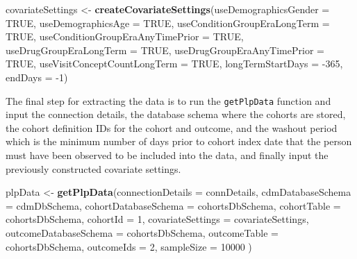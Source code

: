 \documentclass[11pt]{book}
\newenvironment{Shaded}{\begin{snugshade}}{\end{snugshade}}
\newcommand{\DataTypeTok}[1]{\textcolor[rgb]{0.13,0.29,0.53}{#1}}
\newcommand{\DecValTok}[1]{\textcolor[rgb]{0.00,0.00,0.81}{#1}}
\newcommand{\KeywordTok}[1]{\textcolor[rgb]{0.13,0.29,0.53}{\textbf{#1}}}
\newcommand{\NormalTok}[1]{#1}
\newcommand{\OtherTok}[1]{\textcolor[rgb]{0.56,0.35,0.01}{#1}}
\newcommand{\StringTok}[1]{\textcolor[rgb]{0.31,0.60,0.02}{#1}}
\theoremstyle{definition}
\theoremstyle{definition}
\theoremstyle{definition}
\theoremstyle{remark}
\begin{document}
\begin{Shaded}
\begin{Highlighting}[]
\NormalTok{covariateSettings <-}
\StringTok{  }\KeywordTok{createCovariateSettings}\NormalTok{(}\DataTypeTok{useDemographicsGender =} \OtherTok{TRUE}\NormalTok{,}
                          \DataTypeTok{useDemographicsAge =} \OtherTok{TRUE}\NormalTok{,}
                          \DataTypeTok{useConditionGroupEraLongTerm =} \OtherTok{TRUE}\NormalTok{,}
                          \DataTypeTok{useConditionGroupEraAnyTimePrior =} \OtherTok{TRUE}\NormalTok{,}
                          \DataTypeTok{useDrugGroupEraLongTerm =} \OtherTok{TRUE}\NormalTok{,}
                          \DataTypeTok{useDrugGroupEraAnyTimePrior =} \OtherTok{TRUE}\NormalTok{,}
                          \DataTypeTok{useVisitConceptCountLongTerm =} \OtherTok{TRUE}\NormalTok{,}
                          \DataTypeTok{longTermStartDays =} \DecValTok{-365}\NormalTok{,}
                          \DataTypeTok{endDays =} \DecValTok{-1}\NormalTok{)}
\end{Highlighting}
\end{Shaded}

The final step for extracting the data is to run the \texttt{getPlpData} function and input the connection details, the database schema where the cohorts are stored, the cohort definition IDs for the cohort and outcome, and the washout period which is the minimum number of days prior to cohort index date that the person must have been observed to be included into the data, and finally input the previously constructed covariate settings.

\begin{Shaded}
\begin{Highlighting}[]
\NormalTok{plpData <-}\StringTok{ }\KeywordTok{getPlpData}\NormalTok{(}\DataTypeTok{connectionDetails =}\NormalTok{ connDetails,}
                      \DataTypeTok{cdmDatabaseSchema =}\NormalTok{ cdmDbSchema,}
                      \DataTypeTok{cohortDatabaseSchema =}\NormalTok{ cohortsDbSchema,}
                      \DataTypeTok{cohortTable =}\NormalTok{ cohortsDbSchema,}
                      \DataTypeTok{cohortId =} \DecValTok{1}\NormalTok{,}
                      \DataTypeTok{covariateSettings =}\NormalTok{ covariateSettings,}
                      \DataTypeTok{outcomeDatabaseSchema =}\NormalTok{ cohortsDbSchema,}
                      \DataTypeTok{outcomeTable =}\NormalTok{ cohortsDbSchema,}
                      \DataTypeTok{outcomeIds =} \DecValTok{2}\NormalTok{,}
                      \DataTypeTok{sampleSize =} \DecValTok{10000}
\NormalTok{)}
\end{Highlighting}
\end{Shaded}
\end{document}
